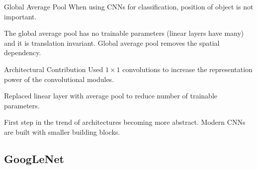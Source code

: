 \begin{frame}[allowframebreaks]

\begin{myconceptblock}{7.15}{Global Average Pool}
    When using CNNs for classification, position of object is not important.

    The global average pool has no trainable parameters (linear layers have many) and it is translation invariant. Global average pool removes the spatial dependency.
\end{myconceptblock}

\end{frame}

\begin{frame}[allowframebreaks]

\begin{myconceptblock}{7.16}{Architectural Contribution}
    Used $1 \times 1$ convolutions to increase the representation power of the convolutional modules.

    Replaced linear layer with average pool to reduce number of trainable parameters.

    First step in the trend of architectures becoming more abstract. Modern CNNs are built with smaller building blocks.
\end{myconceptblock}

\end{frame}

\subsection{GoogLeNet}

